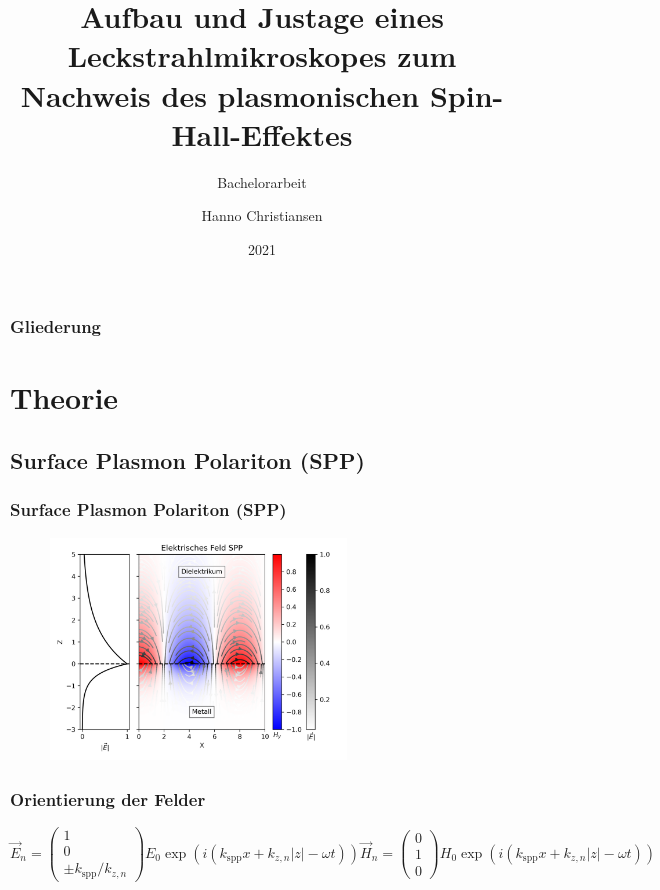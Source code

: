 \documentclass[aspectratio=1610]{beamer}
\title{Aufbau und Justage eines Leckstrahlmikroskopes zum Nachweis des plasmonischen Spin-Hall-Effektes}
\subtitle{Bachelorarbeit}
\author{Hanno Christiansen}
\institute{Christian-Albrechts-Universität zu Kiel}
\date{2021}
\begin{document}
	
	\frame{\titlepage}
	
	\begin{frame}
		\frametitle{Gliederung}
		\tableofcontents
	\end{frame}

	\section{Theorie}
		\subsection{Surface Plasmon Polariton (SPP)}	
		\begin{frame}
			\frametitle{Surface Plasmon Polariton (SPP)}	
			\begin{figure}[h]
				\centering
				\includegraphics[width=0.7\textwidth]{figures/E_Feld_SPP.png}
			\end{figure}	
			
		\end{frame}
	
		\begin{frame}
			\frametitle{Orientierung der Felder}
				\begin{subequations}
				\begin{equation}
					\vec{E}_n = \begin{pmatrix} 1 \\ 0 \\ \pm k_{\mathrm{spp}}/k_{z,n} \end{pmatrix} E_0 \exp\left(i(k_{\mathrm{spp}}x + k_{z, n}|z|-\omega t)\right)	
				\end{equation}
				\begin{equation}
					\vec{H}_n = \begin{pmatrix} 0 \\ 1 \\ 0 \end{pmatrix} H_0 \exp\left(i(k_{\mathrm{spp}}x + k_{z, n}|z|-\omega t)\right)
				\end{equation}
			\end{subequations}
		\end{frame}
	
\end{document}
